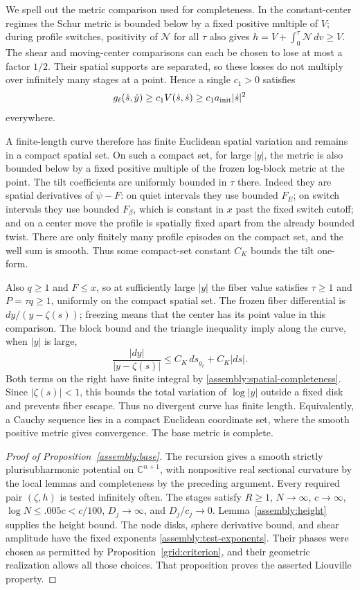 We spell out the metric comparison used for completeness.
In the constant-center regimes the Schur metric is bounded
below by a fixed positive multiple of $V$; during profile
switches, positivity of $\mathcal N$ for all $\tau$ also
gives $h=V+\int_0^\tau\mathcal N\,dv\geq V$.
The shear and moving-center comparisons can each be chosen
to lose at most a factor $1/2$. Their spatial supports are
separated, so these losses do not multiply over infinitely
many stages at a point. Hence a single $c_1>0$ satisfies
\begin{equation}\label{assembly:spatial-completeness}
 g_\ell(\dot s,\dot y)\geq c_1 V(\dot s,\dot s)
 \geq c_1a_{\rm init}|\dot s|^2
\end{equation}
everywhere.

A finite-length curve therefore has finite Euclidean
spatial variation and remains in a compact spatial set.
On such a compact set, for large $|y|$, the metric is also
bounded below by a fixed positive multiple of the frozen
log-block metric at the point. The tilt coefficients are
uniformly bounded in $\tau$ there. Indeed they are spatial
derivatives of $\psi-F$: on quiet intervals they use bounded
$F_E$; on switch intervals they use bounded $F_\beta$, which
is constant in $x$ past the fixed switch cutoff; and on a
center move the profile is spatially fixed apart from the
already bounded twist. There are only finitely many profile
episodes on the compact set, and the well sum is smooth.
Thus some compact-set constant $C_K$ bounds the tilt one-form.

Also $q\geq1$ and $F\leq x$, so at sufficiently large $|y|$
the fiber value satisfies $\tau\geq1$ and $P=\tau q\geq1$,
uniformly on the compact spatial set.
The frozen fiber differential is $dy/(y-\zeta(s))$; freezing
means that the center has its point value in this comparison.
The block bound and the triangle inequality imply along
the curve, when $|y|$ is large,
\[
 \frac{|dy|}{|y-\zeta(s)|}
 \leq C_K\,ds_{g_\ell}+C_K|ds|.
\]
Both terms on the right have finite integral by
\eqref{assembly:spatial-completeness}. Since $|\zeta(s)|<1$,
this bounds the total variation of $\log|y|$ outside a
fixed disk and prevents fiber escape. Thus no divergent
curve has finite length. Equivalently, a Cauchy sequence
lies in a compact Euclidean coordinate set, where the
smooth positive metric gives convergence. The base metric
is complete.

\begin{proof}[Proof of Proposition~\ref{assembly:base}]
The recursion gives a smooth strictly plurisubharmonic
potential on $\mathbb C^{n+1}$, with nonpositive real
sectional curvature by the local lemmas and completeness
by the preceding argument. Every required pair
$(\zeta,h)$ is tested infinitely often. The stages satisfy
$R\geq1$, $N\to\infty$, $c\to\infty$,
$\log N\leq.005c<c/100$, $D_j\to\infty$, and
$D_j/c_j\to0$. Lemma~\ref{assembly:height} supplies the
height bound. The node disks, sphere derivative bound,
and shear amplitude have the fixed exponents
\eqref{assembly:test-exponents}. Their phases were chosen
as permitted by Proposition~\ref{grid:criterion}, and
their geometric realization allows all those choices.
That proposition proves the asserted Liouville property.
\end{proof}

